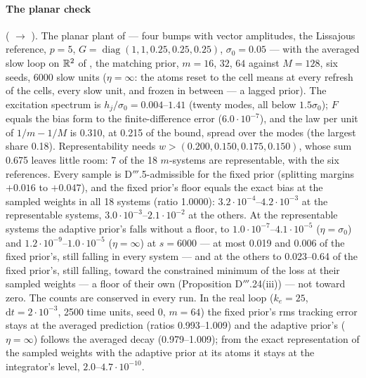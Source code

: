 \paragraph{The planar check} ( $\to$ ). The
planar plant of  --- four bumps with vector amplitudes, the Lissajous reference, $p = 5$,
$G = \operatorname{diag}(1,1,0.25,0.25,0.25)$, $\sigma_0 = 0.05$ --- with the averaged slow loop on $\mathbb{R}^2$ of
, the matching prior, $m = 16$, $32$, $64$ against $M = 128$, six seeds, 6000 slow units
($\eta = \infty$: the atoms reset to the cell means at every refresh of the cells, every slow unit, and frozen in
between --- a lagged prior). The excitation spectrum is $h_j/\sigma_0 = 0.004$--$1.41$ (twenty modes, all below
$1.5\sigma_0$); $F$ equals the bias form to the finite-difference error ($6.0\cdot10^{-7}$), and the law per unit of
$1/m - 1/M$ is 0.310, at 0.215 of the bound, spread over the modes (the largest share 0.18). Representability needs
$w > (0.200,0.150,0.175,0.150)$, whose sum 0.675 leaves little room: 7 of the 18 $m$-systems are representable, with
the six references. Every sample is D$'''$.5-admissible for the fixed prior (splitting margins $+0.016$ to $+0.047$),
and the fixed prior's floor equals the exact bias at the sampled weights in all 18 systems (ratio 1.0000):
$3.2\cdot10^{-4}$--$4.2\cdot10^{-3}$ at the representable systems, $3.0\cdot10^{-3}$--$2.1\cdot10^{-2}$ at the others.
At the representable systems the adaptive prior's falls without a floor, to $1.0\cdot10^{-7}$--$4.1\cdot10^{-5}$
($\eta = \sigma_0$) and $1.2\cdot10^{-9}$--$1.0\cdot10^{-5}$ ($\eta = \infty$) at $s = 6000$ --- at most 0.019 and
0.006 of the fixed prior's, still falling in every system --- and at the others to 0.023--0.64 of the fixed prior's,
still falling, toward the constrained minimum of the loss at their sampled weights --- a floor of their own
(Proposition D$'''$.24(iii)) --- not toward zero. The counts are conserved in every run. In the real loop ($k_e = 25$,
$\mathrm{d}t = 2\cdot10^{-3}$, 2500 time units, seed 0, $m = 64$) the fixed prior's rms tracking error stays at the
averaged prediction (ratios 0.993--1.009) and the adaptive prior's ($\eta = \infty$) follows the averaged decay
(0.979--1.009); from the exact representation of the sampled weights with the adaptive prior at its atoms it stays at
the integrator's level, $2.0$--$4.7\cdot10^{-10}$.


